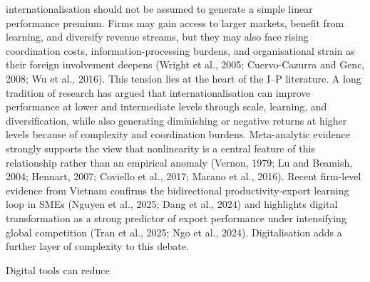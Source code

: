 \documentclass[12pt,a4paper]{article}
\begin{document}
internationalisation should not be assumed to generate a simple linear
performance premium. Firms may gain access to larger markets, benefit
from learning, and diversify revenue streams, but they may also face
rising coordination costs, information-processing burdens, and
organisational strain as their foreign involvement deepens (Wright et
al., 2005; Cuervo-Cazurra and Genc, 2008; Wu et al., 2016). This tension
lies at the heart of the I--P literature. A long tradition of research
has argued that internationalisation can improve performance at lower
and intermediate levels through scale, learning, and diversification,
while also generating diminishing or negative returns at higher levels
because of complexity and coordination burdens. Meta-analytic evidence
strongly supports the view that nonlinearity is a central feature of
this relationship rather than an empirical anomaly (Vernon, 1979; Lu and
Beamish, 2004; Hennart, 2007; Coviello et al., 2017; Marano et al.,
2016). Recent firm-level evidence from Vietnam confirms the
bidirectional productivity-export learning loop in SMEs (Nguyen et al.,
2025; Dang et al., 2024) and highlights digital transformation as a
strong predictor of export performance under intensifying global
competition (Tran et al., 2025; Ngo et al., 2024). Digitalisation adds a
further layer of complexity to this debate.

Digital tools can reduce
\end{document}
